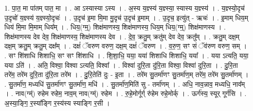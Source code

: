 \documentclass[17pt]{extarticle}
\begin{document}
1. पा॒त॒ मा पा॑तम् पात॒ मा । . आ ऽस्यास्या ऽस्य । . अ॒स्य य॒ज्ञ्स्य॑ य॒ज्ञ्स्या॒ स्यास्य य॒ज्ञ्स्य॑ । . य॒ज्ञ्स्यो॒दृच॑ उ॒दृचो॑ य॒ज्ञ्स्य॑ य॒ज्ञ्स्यो॒दृचः॑ । . उ॒दृच॑ इ॒मा मि॒मा मु॒दृच॑ उ॒दृच॑ इ॒माम् । . उ॒दृच॒ इत्यु॑त् - ऋचः॑ । . इ॒माम् धिय॒म् धिय॑ मि॒मा मि॒माम् धिय᳚म् । . धिय॒(ग्म्॒) शिक्ष॑माणस्य॒ शिक्ष॑माणस्य॒ धिय॒म् धिय॒(ग्म्॒) शिक्ष॑माणस्य । . शिक्ष॑माणस्य देव देव॒ शिक्ष॑माणस्य॒ शिक्ष॑माणस्य देव । . दे॒व॒ क्रतु॒म् क्रतु॑म् देव देव॒ क्रतु᳚म् । . क्रतु॒म् दक्ष॒म् दक्ष॒म् क्रतु॒म् क्रतु॒म् दक्ष᳚म् । . दक्षं॑ ॅवरुण वरुण॒ दक्ष॒म् दक्षं॑ ॅवरुण । . व॒रु॒ण॒ सꣳ सं ॅव॑रुण वरुण॒ सम् । . सꣳ शि॑शाधि शिशाधि॒ सꣳ सꣳ शि॑शाधि । . शि॒शा॒धि॒ यया॒ यया॑ शिशाधि शिशाधि॒ यया᳚ । . यया ऽत्यति॒ यया॒ यया ऽति॑ । . अति॒ विश्वा॒ विश्वा ऽत्यति॒ विश्वा᳚ । . विश्वा॑ दुरि॒ता दु॑रि॒ता विश्वा॒ विश्वा॑ दुरि॒ता । . दु॒रि॒ता तरे॑म॒ तरे॑म दुरि॒ता दु॑रि॒ता तरे॑म । . दु॒रि॒तेति॑ दुः - इ॒ता । . तरे॑म सु॒तर्मा॑णꣳ सु॒तर्मा॑ण॒म् तरे॑म॒ तरे॑म सु॒तर्मा॑णम् । . सु॒तर्मा॑ण॒ मध्यधि॑ सु॒तर्मा॑णꣳ सु॒तर्मा॑ण॒ मधि॑ । . सु॒तर्मा॑ण॒मिति॑ सु - तर्मा॑णम् । . अधि॒ नाव॒न्नाव॒ मध्यधि॒ नाव᳚म् । . नाव(ग्म्॑) रुहेम रुहेम॒ नाव॒म् नाव(ग्म्॑) रुहेम । . रु॒हे॒मोर्गूर्ग् रु॑हेम रुहे॒मोर्क् । . ऊर्ग॑स्य॒ स्यूर् गूर्ग॑सि । . अ॒स्या॒ङ्गि॒ र॒स्या᳚ङ्गि र॒स्य॑स्य स्याङ्गि र॒सी । \newline
\end{document}

